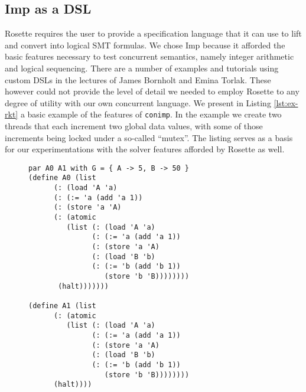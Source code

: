 \subsection{Imp as a DSL}
Rosette requires the user to provide a specification language that it can use to lift and convert into logical SMT formulas.  We chose Imp because it afforded the basic features necessary to test concurrent semantics, namely integer arithmetic and logical sequencing.  There are a number of examples and tutorials using custom DSLs  in the lectures of James Bornholt and Emina Torlak.  These however could not provide the level of detail we needed to employ Rosette to any degree of utility with our own concurrent language.  We present in Listing \ref{lst:ex-rkt} a basic example of the features of \texttt{conimp}.  In the example we create two threads that each increment two global data values, with some of those increments being locked under a so-called ``mutex''.  The listing serves as a basis for our experimentations with the solver features afforded by Rosette as well.

\begin{figure}[!h]
\begin{lstlisting}[label={lst:ex-rkt},caption={Two threads concurrently updating a global store (\texttt{conimp}).},captionpos=b,frame=single,xleftmargin=1em]
par A0 A1 with G = { A -> 5, B -> 50 }  
(define A0 (list
      (: (load 'A 'a)
      (: (:= 'a (add 'a 1))
      (: (store 'a 'A)
      (: (atomic
         (list (: (load 'A 'a)
               (: (:= 'a (add 'a 1))
               (: (store 'a 'A)
               (: (load 'B 'b)
               (: (:= 'b (add 'b 1))
                  (store 'b 'B))))))))
       (halt)))))))

(define A1 (list
      (: (atomic
         (list (: (load 'A 'a)
               (: (:= 'a (add 'a 1))
               (: (store 'a 'A)
               (: (load 'B 'b)
               (: (:= 'b (add 'b 1))
                  (store 'b 'B))))))))
      (halt))))
  
\end{lstlisting}
\end{figure}

